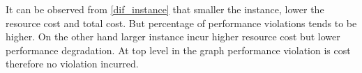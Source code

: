 It can be observed from \ref{dif_instance} that smaller the instance, lower the resource cost and total cost. But percentage of performance violations tends to be higher. On the other hand larger instance incur higher resource cost but lower performance degradation. At top level in the graph performance violation is cost therefore no  violation incurred.
